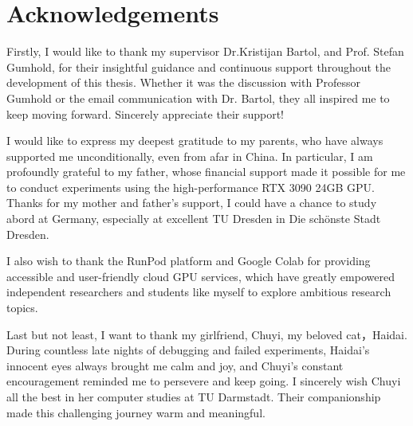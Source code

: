 \section{Acknowledgements}

Firstly, I would like to thank my supervisor Dr.Kristijan Bartol, and Prof. Stefan Gumhold, for their insightful guidance and continuous support throughout the development of this thesis.  Whether it was the discussion with Professor Gumhold or the email communication with Dr. Bartol, they all inspired me to keep moving forward. Sincerely appreciate their support!

I would like to express my deepest gratitude to my parents, who have always supported me unconditionally, even from afar in China. In particular, I am profoundly grateful to my father, whose financial support made it possible for me to conduct experiments using the high-performance RTX 3090 24GB GPU. Thanks for my mother and father's support, I could have a chance to study abord at Germany, especially at excellent TU Dresden in Die schönste Stadt Dresden.

I also wish to thank the RunPod platform and Google Colab for providing accessible and user-friendly cloud GPU services, which have greatly empowered independent researchers and students like myself to explore ambitious research topics.

Last but not least, I want to thank my girlfriend, Chuyi, my beloved cat，Haidai. During countless late nights of debugging and failed experiments, Haidai’s innocent eyes always brought me calm and joy, and Chuyi’s constant encouragement reminded me to persevere and keep going. I sincerely wish Chuyi all the best in her computer studies at TU Darmstadt. Their companionship made this challenging journey warm and meaningful.
